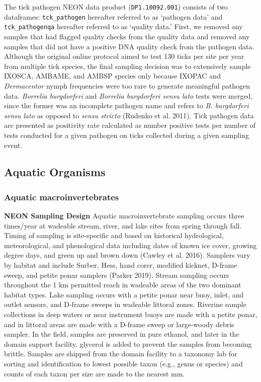 \documentclass[
  12pt,
]{article}
\begin{document}
The tick pathogen NEON data product (\texttt{DP1.10092.001}) consists of two dataframes: \texttt{tck\_pathogen} hereafter referred to as `pathogen data' and \texttt{tck\_pathogenqa} hereafter referred to as `quality data.' First, we removed any samples that had flagged quality checks from the quality data and removed any samples that did not have a positive DNA quality check from the pathogen data. Although the original online protocol aimed to test 130 ticks per site per year from multiple tick species, the final sampling decision was to extensively sample IXOSCA, AMBAME, and AMBSP species only because IXOPAC and \emph{Dermacentor} nymph frequencies were too rare to generate meaningful pathogen data. \emph{Borrelia burgdorferi} and \emph{Borrelia burgdorferi sensu lato} tests were merged, since the former was an incomplete pathogen name and refers to \emph{B. burgdorferi sensu lato} as opposed to \emph{sensu stricto} (Rudenko et al. 2011). Tick pathogen data are presented as positivity rate calculated as number positive tests per number of tests conducted for a given pathogen on ticks collected during a given sampling event.

\hypertarget{aquatic-organisms}{%
\subsection{Aquatic Organisms}\label{aquatic-organisms}}

\hypertarget{aquatic-macroinvertebrates}{%
\subsubsection{Aquatic macroinvertebrates}\label{aquatic-macroinvertebrates}}

\textbf{NEON Sampling Design} Aquatic macroinvertebrate sampling occurs three times/year at wadeable stream, river, and lake sites from spring through fall. Timing of sampling is site-specific and based on historical hydrological, meteorological, and phenological data including dates of known ice cover, growing degree days, and green up and brown down (Cawley et al. 2016). Samplers vary by habitat and include Surber, Hess, hand corer, modified kicknet, D-frame sweep, and petite ponar samplers (Parker 2019). Stream sampling occurs throughout the 1 km permitted reach in wadeable areas of the two dominant habitat types. Lake sampling occurs with a petite ponar near buoy, inlet, and outlet sensors, and D-frame sweeps in wadeable littoral zones. Riverine sample collections in deep waters or near instrument buoys are made with a petite ponar, and in littoral areas are made with a D-frame sweep or large-woody debris sampler. In the field, samples are preserved in pure ethanol, and later in the domain support facility, glycerol is added to prevent the samples from becoming brittle. Samples are shipped from the domain facility to a taxonomy lab for sorting and identification to lowest possible taxon (e.g., genus or species) and counts of each taxon per size are made to the nearest mm.
\end{document}
